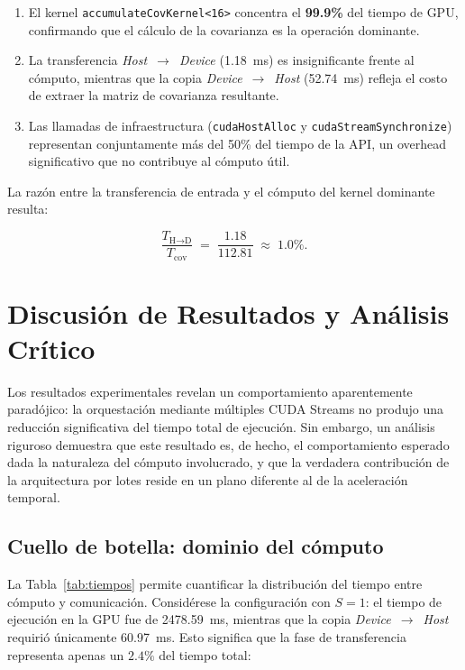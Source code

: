 \documentclass[12pt, a4paper]{article}
\begin{document}
\begin{enumerate}
    \item El kernel \texttt{accumulateCovKernel<16>} concentra el
          \textbf{99.9\%} del tiempo de GPU, confirmando que el cálculo de la
          covarianza es la operación dominante.
    \item La transferencia \textit{Host}~$\to$~\textit{Device} (1.18~ms)
          es insignificante frente al cómputo, mientras que la copia
          \textit{Device}~$\to$~\textit{Host} (52.74~ms) refleja el costo
          de extraer la matriz de covarianza resultante.
    \item Las llamadas de infraestructura (\texttt{cudaHostAlloc} y
          \texttt{cudaStreamSynchronize}) representan conjuntamente más del
          50\% del tiempo de la API, un overhead significativo que no
          contribuye al cómputo útil.
\end{enumerate}

La razón entre la transferencia de entrada y el cómputo del kernel dominante
resulta:

\begin{equation}
    \frac{T_{\text{H}\to\text{D}}}{T_{\text{cov}}} \;=\;
    \frac{1.18}{112.81} \;\approx\; 1.0\%.
\end{equation}

\section{Discusión de Resultados y Análisis Crítico}

Los resultados experimentales revelan un comportamiento aparentemente
paradójico: la orquestación mediante múltiples CUDA Streams no produjo una
reducción significativa del tiempo total de ejecución. Sin embargo, un análisis
riguroso demuestra que este resultado es, de hecho, el comportamiento esperado
dada la naturaleza del cómputo involucrado, y que la verdadera contribución de
la arquitectura por lotes reside en un plano diferente al de la aceleración
temporal.

\subsection{Cuello de botella: dominio del cómputo}

La Tabla~\ref{tab:tiempos} permite cuantificar la distribución del tiempo
entre cómputo y comunicación. Considérese la configuración con $S = 1$: el
tiempo de ejecución en la GPU fue de 2478.59~ms, mientras que la copia
\textit{Device}~$\to$~\textit{Host} requirió únicamente 60.97~ms. Esto
significa que la fase de transferencia representa apenas un
$\mathbf{2.4\%}$ del tiempo total:
\end{document}
